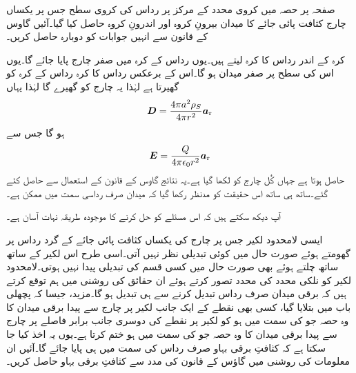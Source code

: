 صفحہ  پر حصہ  میں کروی محدد کے مرکز پر   رداس کی کروی سطح جس پر یکساں  چارج کثافت پائی جائے کا میدان بیرونِ کروہ اور اندرونِ کروہ حاصل کیا گیا۔آئیں گاوس کے قانون سے انہیں جوابات کو دوبارہ حاصل کریں۔

کرہ کے اندر  رداس کا کرہ لیتے ہیں۔یوں  رداس کے کرہ میں صفر چارج پایا جائے گا۔یوں اس کی سطح پر صفر میدان ہو گا۔اس کے برعکس  رداس کا کرہ  رداس کے کرہ کو گھیرتا ہے لہٰذا یہ  چارج کو گھیرے گا لہٰذا یہاں
\begin{align*}
{\ensuremath{{\boldsymbol{D}}}}=\frac{4\pi a^2\rho_S}{4\pi r^2 }{\boldsymbol{a}}_{\textup{r}}
\end{align*}
ہو گا جس سے
\begin{align*}
{\ensuremath{{\boldsymbol{E}}}}=\frac{Q}{4\pi \epsilon_0 r^2 }{\boldsymbol{a}}_{\textup{r}}
\end{align*}
حاصل ہوتا ہے جہاں کُل چارج کو  لکھا گیا ہے۔یہ نتائج گاوس کے قانون کے استعمال سے حاصل کئے گئے۔ساتھ ہی ساتھ اس حقیقت کو مدنظر رکھا گیا کہ میدان صرف رداسی سمت میں ممکن ہے۔

آپ دیکھ سکتے ہیں کہ اس مسئلے کو حل کرنے کا موجودہ طریقہ نہات آسان ہے۔

ایسی لامحدود لکیر جس پر چارج کی یکساں کثافت پائی جائے کے گرد رداس پر گھومتے ہوئے  صورت حال میں کوئی تبدیلی نظر نہیں آتی۔اسی طرح اس لکیر کے ساتھ ساتھ چلتے ہوئے بھی صورت حال میں کسی قسم کی تبدیلی پیدا نہیں ہوتی۔لامحدود لکیر کو نلکی محدد کی  محدد تصور کرتے  ہوئے  ان حقائق کی روشنی میں ہم توقع کرتے ہیں کہ برقی میدان صرف  رداس تبدیل کرنے سے ہی تبدیل ہو گا۔مزید، جیسا کہ پچھلی باب میں بتلایا گیا، کسی بھی نقطے کے ایک جانب لکیر پر چارج سے پیدا برقی میدان کا وہ حصہ جو  کی سمت میں ہو کو لکیر پر نقطے کی دوسری جانب برابر فاصلے  پر چارج سے پیدا برقی میدان کا وہ حصہ جو  کی سمت میں ہو  ختم کرتا ہے۔یوں یہ اخذ کیا جا سکتا ہے کہ کثافتِ برقی بہاو صرف رداس کی سمت میں ہی پایا جائے گا۔آئیں ان معلومات کی روشنی میں گاؤس کے قانون کی مدد سے کثافتِ برقی بہاو حاصل کریں۔

